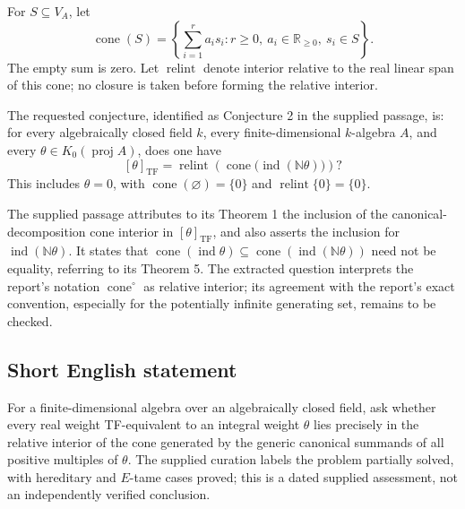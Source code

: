 \documentclass[11pt]{article}
\newcommand{\N}{\mathbb{N}}
\newcommand{\R}{\mathbb{R}}
\begin{document}
For \(S\subseteq V_A\), let
\[
\operatorname{cone}(S)
 =\left\{\sum_{i=1}^{r}a_i s_i:
 r\geq 0,\ a_i\in\R_{\geq0},\ s_i\in S\right\}.
\]
The empty sum is zero. Let \(\operatorname{relint}\) denote interior relative to the real linear span of this cone; no closure is taken before forming the relative interior.

The requested conjecture, identified as Conjecture 2 in the supplied passage, is: for every algebraically closed field \(k\), every finite-dimensional \(k\)-algebra \(A\), and every \(\theta\in K_0(\operatorname{proj}A)\), does one have
\[
[\theta]_{\mathrm{TF}}
 =\operatorname{relint}\!\left(
 \operatorname{cone}\bigl(\operatorname{ind}(\N\theta)\bigr)
 \right)?
\]
This includes \(\theta=0\), with \(\operatorname{cone}(\varnothing)=\{0\}\) and \(\operatorname{relint}\{0\}=\{0\}\).

The supplied passage attributes to its Theorem 1 the inclusion of the canonical-decomposition cone interior in \([\theta]_{\mathrm{TF}}\), and also asserts the inclusion for \(\operatorname{ind}(\N\theta)\). It states that \(\operatorname{cone}(\operatorname{ind}\theta)\subseteq\operatorname{cone}(\operatorname{ind}(\N\theta))\) need not be equality, referring to its Theorem 5. The extracted question interprets the report's notation \(\operatorname{cone}^{\circ}\) as relative interior; its agreement with the report's exact convention, especially for the potentially infinite generating set, remains to be checked.
\subsection{Short English statement}
For a finite-dimensional algebra over an algebraically closed field, ask whether every real weight TF-equivalent to an integral weight \(\theta\) lies precisely in the relative interior of the cone generated by the generic canonical summands of all positive multiples of \(\theta\). The supplied curation labels the problem partially solved, with hereditary and \(E\)-tame cases proved; this is a dated supplied assessment, not an independently verified conclusion.
\end{document}
